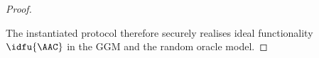 \begin{proof}
\begin{description}
  \end{description}

  The instantiated protocol therefore securely realises ideal functionality
$\idfu{\AAC}$ in the GGM and the random oracle model.

\end{proof}

